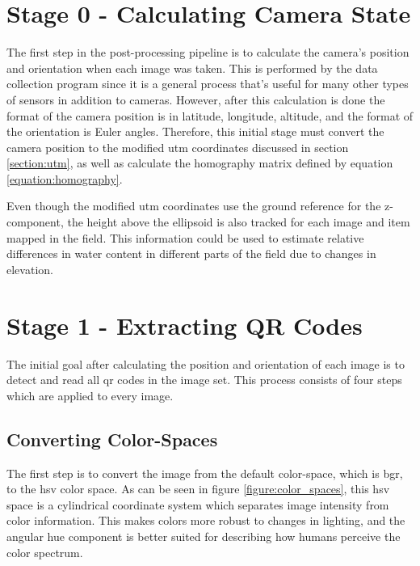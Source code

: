 \section{Stage 0 - Calculating Camera State}
\label{processing-stage0}

The first step in the post-processing pipeline is to calculate the camera's position and orientation when each image was taken.  This is performed by the data collection program since it is a general process that's useful for many other types of sensors in addition to cameras.  However, after this calculation is done the format of the camera position is in latitude, longitude, altitude, and the format of the orientation is Euler angles.  Therefore, this initial stage must convert the camera position to the modified \ac{utm} coordinates discussed in section \ref{section:utm}, as well as calculate the homography matrix defined by equation \ref{equation:homography}.  

Even though the modified \ac{utm} coordinates use the ground reference for the z-component, the height above the ellipsoid is also tracked for each image and item mapped in the field.  This information could be used to estimate relative differences in water content in different parts of the field due to changes in elevation. 

\section{Stage 1 - Extracting QR Codes}
\label{processing-stage1}

The initial goal after calculating the position and orientation of each image is to detect and read all \ac{qr} codes in the image set.  This process consists of four steps which are applied to every image.

\subsection{Converting Color-Spaces}

The first step is to convert the image from the default color-space, which is \ac{bgr}, to the \ac{hsv} color space.  As can be seen in figure \ref{figure:color_spaces}, this \ac{hsv} space is a cylindrical coordinate system which separates image intensity from color information.  This makes colors more robust to changes in lighting, and the angular hue component is better suited for describing how humans perceive the color spectrum.

